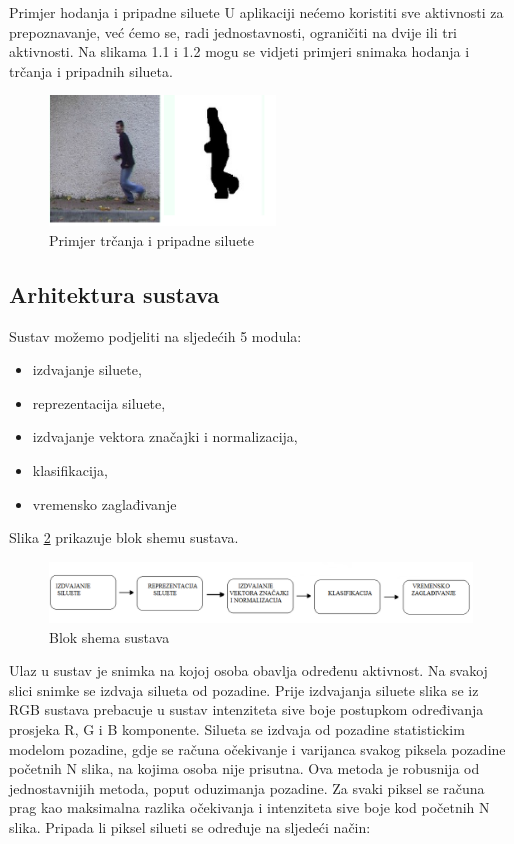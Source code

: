 \documentclass[times, utf8, diplomski]{fer}
\begin{document}
Primjer hodanja i pripadne siluete
U aplikaciji nećemo koristiti sve aktivnosti za prepoznavanje, već ćemo se, radi
jednostavnosti, ograničiti na dvije ili tri aktivnosti. Na slikama 1.1 i 1.2 mogu se vidjeti
primjeri snimaka hodanja i trčanja i pripadnih silueta.
\newline
\begin{figure}[ht!]
\centering
\includegraphics[width=60mm]{run.png}
\caption{ Primjer trčanja i pripadne siluete \label{overflow}}
\end{figure}


\subsection{Arhitektura sustava}

Sustav možemo podjeliti na sljedećih 5 modula:
\begin{itemize}
\item izdvajanje siluete,
\item reprezentacija siluete,
\item izdvajanje vektora značajki i normalizacija,
\item klasifikacija,
\item vremensko zaglađivanje
\end{itemize}

Slika \ref{img:blok} prikazuje blok shemu sustava.

\begin{figure}[ht]
\centering
\includegraphics[width=170mm]{arhitektura.png}
\caption{ Blok shema sustava \label{overflow}}
\label{img:blok}
\end{figure}

Ulaz u sustav je snimka na kojoj osoba obavlja određenu aktivnost. Na svakoj slici snimke se
izdvaja silueta od pozadine. Prije izdvajanja siluete slika se iz RGB sustava prebacuje u sustav
intenziteta sive boje postupkom određivanja prosjeka R, G i B komponente. Silueta se izdvaja
od pozadine statistickim modelom pozadine, gdje se računa očekivanje i varijanca svakog
piksela pozadine početnih N slika, na kojima osoba nije prisutna. Ova metoda je robusnija od
jednostavnijih metoda, poput oduzimanja pozadine. Za svaki piksel se računa prag kao
maksimalna razlika očekivanja i intenziteta sive boje kod početnih N slika. Pripada li piksel
silueti se određuje na sljedeći način: 
\end{document}
